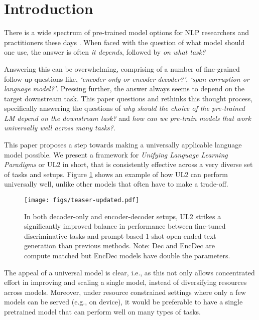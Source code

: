 \documentclass[10pt]{article}
\begin{document}
\tableofcontents
\newpage
\section{Introduction}



There is a wide spectrum of pre-trained model options for NLP researchers and practitioners these days \citep{devlin2018bert,brown2020language,raffel2019exploring,Radford2019,liu2019roberta,yang2019xlnet, thoppilan2022lamda,fedus2021switch,du2021glam,chowdhery2022palm}. When faced with the question of what model should one use, the answer is often \textit{it depends}, followed by \textit{on what task?}

Answering this can be overwhelming, comprising of a number of fine-grained follow-up questions like, \textit{`encoder-only or encoder-decoder?'}, \textit{`span corruption or language model?'}. Pressing further, the answer always seems to depend on the target downstream task. This paper questions and rethinks this thought process, specifically answering the questions of \textit{why should the choice of the pre-trained LM depend on the downstream task?} and \textit{how can we pre-train models that work universally well across many tasks?}.

This paper proposes a step towards making a universally applicable language model possible. We present a framework for \textit{Unifying Language Learning Paradigms} or UL2 in short, that is consistently effective across a very diverse set of tasks and setups. Figure \ref{fig:UL2-scatter} shows an example of how UL2 can perform universally well, unlike other models that often have to make a trade-off.

\begin{figure}[H]
    \centering
\texttt{[image: figs/teaser-updated.pdf]}
    \captionsetup{width=\linewidth}
\caption{In both decoder-only and encoder-decoder setups, UL2 strikes a significantly improved balance in performance between fine-tuned discriminative tasks and prompt-based 1-shot open-ended text generation than previous methods. Note: Dec and EncDec are compute matched but EncDec models have double the parameters.}
  \label{fig:UL2-scatter}
\vspace{-1em}
\end{figure}

The appeal of a universal model is clear, i.e., as this not only allows concentrated effort in improving and scaling a single model, instead of diversifying resources across  models. Moreover, under resource constrained settings where only a few models can be served (e.g., on device), it would be preferable to have a single pretrained model that can perform well on many types of tasks.
\end{document}
